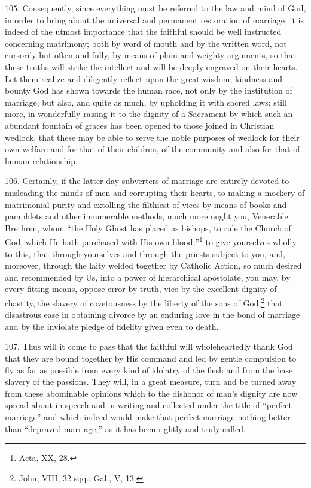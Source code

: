\documentclass[12pt,a4paper]{book}
\begin{document}
105. Consequently, since everything must be referred to the law and mind of God, in order to bring about the universal and permanent restoration of marriage, it is indeed of the utmost importance that the faithful should be well instructed concerning matrimony; both by word of mouth and by the written word, not cursorily but often and fully, by means of plain and weighty arguments, so that these truths will strike the intellect and will be deeply engraved on their hearts. Let them realize and diligently reflect upon the great wisdom, kindness and bounty God has shown towards the human race, not only by the institution of marriage, but also, and quite as much, by upholding it with sacred laws; still more, in wonderfully raising it to the dignity of a Sacrament by which such an abundant fountain of graces has been opened to those joined in Christian wedlock, that these may be able to serve the noble purposes of wedlock for their own welfare and for that of their children, of the community and also for that of human relationship.

106. Certainly, if the latter day subverters of marriage are entirely devoted to misleading the minds of men and corrupting their hearts, to making a mockery of matrimonial purity and extolling the filthiest of vices by means of books and pamphlets and other innumerable methods, much more ought you, Venerable Brethren, whom ``the Holy Ghost has placed as bishops, to rule the Church of God, which He hath purchased with His own blood,''\footnote{Acta, XX, 28.} to give yourselves wholly to this, that through yourselves and through the priests subject to you, and, moreover, through the laity welded together by Catholic Action, so much desired and recommended by Us, into a power of hierarchical apostolate, you may, by every fitting means, oppose error by truth, vice by the excellent dignity of chastity, the slavery of covetousness by the liberty of the sons of God,\footnote{John, VIII, 32 sqq.; Gal., V, 13.} that disastrous ease in obtaining divorce by an enduring love in the bond of marriage and by the inviolate pledge of fidelity given even to death.

107. Thus will it come to pass that the faithful will wholeheartedly thank God that they are bound together by His command and led by gentle compulsion to fly as far as possible from every kind of idolatry of the flesh and from the base slavery of the passions. They will, in a great measure, turn and be turned away from these abominable opinions which to the dishonor of man's dignity are now spread about in speech and in writing and collected under the title of ``perfect marriage'' and which indeed would make that perfect marriage nothing better than ``depraved marriage,'' as it has been rightly and truly called.
\end{document}
